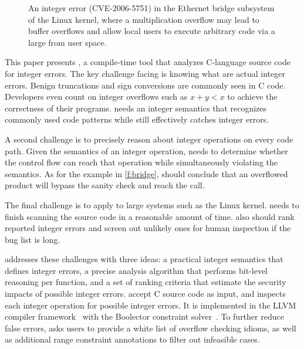 \begin{figure}[t]
\centering

\vspace{-1em}
\caption{An integer error (CVE-2006-5751) in the Ethernet
bridge subsystem of the Linux kernel, where a multiplication overflow
may lead to buffer overflows and allow local users to execute
arbitrary code via a large  from user space.}
\label{f:bridge}
\end{figure}

This paper presents \sys, a compile-time tool that analyzes C-language
source code for integer errors.
%
The key challenge facing \sys is knowing what are actual integer
errors.  Benign truncations and sign conversions are commonly seen
in C code.  Developers even count on integer overflows such as $x
+ y < x$ to achieve the correctness of their programs.  \sys needs
an integer semantics that recognizes commonly used code patterns
while still effectively catches integer errors.

A second challenge is to precisely reason about integer operations
on every code path.  Given the semantics of an integer operation,
\sys needs to determine whether the control flow can reach that
operation while simultaneously violating the semantics.  As for the
example in \autoref{f:bridge}, \sys should conclude that an overflowed
product  will bypass the sanity check and reach the
 call.

The final challenge is to apply \sys to large systems such as the
Linux kernel.  \sys needs to finish scanning the source code in a
reasonable amount of time.  \sys also should rank reported integer
errors and screen out unlikely ones for human inspection if the bug
list is long.

\sys addresses these challenges with three ideas: a practical integer
semantics that defines integer errors, a precise analysis algorithm
that performs bit-level reasoning per function, and a set of ranking
criteria that estimate the security impacts of possible integer
errors.  \sys accept C source code as input, and inspects each
integer operation for possible integer errors.
%
It is implemented in the LLVM compiler framework~\cite{lattner:llvm}
with the Boolector constraint solver~\cite{boolector}.
%
To further reduce false errors, \sys asks users to provide a white
list of overflow checking idioms, as well as additional range
constraint annotations to filter out infeasible cases.

